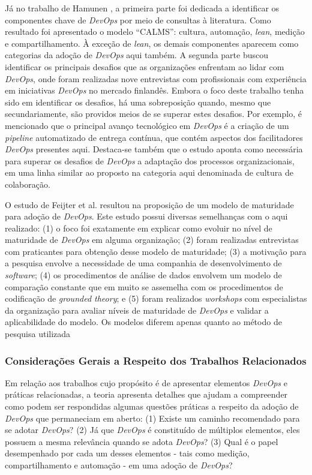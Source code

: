 Já no trabalho de Hamunen \cite{challenges_in_adopting_devops}, a primeira parte
foi dedicada a identificar os componentes chave de {\it DevOps} por meio de
consultas à literatura. Como resultado foi apresentado o modelo ``CALMS'':
cultura, automação, {\it lean}, medição e compartilhamento. À exceção de {\it lean},
os demais componentes aparecem como categorias da adoção de {\it DevOps} aqui
também. A segunda parte buscou identificar os principais desafios que as
organizações enfrentam ao lidar com {\it DevOps}, onde foram realizadas nove
entrevistas com profissionais com experiência em iniciativas {\it DevOps} no
mercado finlandês. Embora o foco deste trabalho tenha sido em identificar os
desafios, há uma sobreposição quando, mesmo que secundariamente, são providos
meios de se superar estes desafios. Por exemplo, é mencionado que o principal
avanço tecnológico em {\it DevOps} é a criação de um {\it pipeline} automatizado
de entrega contínua, que contém aspectos dos facilitadores {\it DevOps} presentes
aqui. Destaca-se também que o estudo aponta como necessária para superar os
desafios de {\it DevOps} a adaptação dos processos organizacionais, em uma
linha similar ao proposto na categoria aqui denominada de cultura de colaboração.

O estudo de Feijter et al. \cite{feijter2017towards} resultou na proposição de
um modelo de maturidade para adoção de {\it DevOps}. Este estudo possui diversas
semelhanças com o aqui realizado: (1) o foco foi exatamente em explicar como evoluir
no nível de maturidade de {\it DevOps} em alguma organização; (2) foram realizadas
entrevistas com praticantes para obtenção desse modelo de maturidade; (3) a motivação
para a pesquisa envolve a necessidade de uma companhia de desenvolvimento de
{\it software}; (4) os procedimentos de análise de dados envolvem um modelo de
comparação constante que em muito se assemelha com os procedimentos de codificação
de {\it grounded theory}; e (5) foram realizados {\it workshops} com especialistas
da organização para avaliar níveis de maturidade de {\it DevOps} e validar
a aplicabilidade do modelo. Os modelos diferem apenas quanto ao método de
pesquisa utilizada

\subsubsection{Considerações Gerais a Respeito dos Trabalhos Relacionados}

Em relação aos trabalhos cujo propósito é de apresentar elementos {\it DevOps} e
práticas relacionadas, a teoria apresenta detalhes que ajudam a
compreender como podem ser respondidas algumas questões práticas a
respeito da adoção de {\it DevOps} que permaneciam em aberto: (1) Existe um caminho
recomendado para se adotar \textit{DevOps}? (2) Já que \textit{DevOps} é
constituído de múltiplos elementos, eles possuem a mesma relevância quando se
adota \textit{DevOps}? (3) Qual é o papel desempenhado por cada um desses
elementos - tais como medição, compartilhamento e automação - em uma adoção de
\textit{DevOps}?

